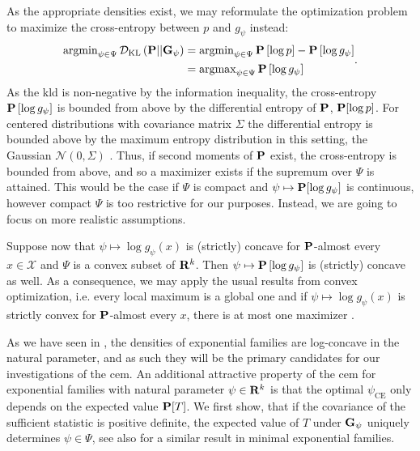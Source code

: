 As the appropriate densities exist, we may reformulate the optimization problem to maximize the cross-entropy between $p$ and $g_{\psi}$ instead:
\begin{align}
    \begin{split}
    \argmin_{\psi \in \Psi} \Dkl{\P}{\G_{\psi}} &=  \argmin_{\psi \in \Psi} \P \left[\log p \right] - \P \left[\log g_{\psi}\right] \\
    &= \argmax_{\psi \in \Psi} \P \left[\log g_{\psi}\right]
    \end{split} \label{eq:ce_argmax}.
\end{align}
As the \acrshort{kld} is non-negative by the information inequality, the cross-entropy $\P \left[ \log g_{\psi} \right]$ is bounded from above by the differential entropy of $\P$, $\P [\log p]$. For centered distributions with covariance matrix $\Sigma$ the differential entropy is bounded above by the maximum entropy distribution in this setting, the Gaussian $\mathcal N(0, \Sigma)$ \citep[Example 12.2.8]{Cover2006Elements}. Thus, if second moments of $\P$ exist, the cross-entropy is bounded from above, and so a maximizer exists if the supremum over $\Psi$ is attained. This would be the case if $\Psi$ is compact and $\psi \mapsto \P [\log g_{\psi}]$ is continuous, however compact $\Psi$ is too restrictive for our purposes. Instead, we are going to focus on more realistic assumptions.

Suppose now that $\psi \mapsto \log g_{\psi}(x)$ is (strictly) concave for $\P$-almost every $x \in \mathcal X$ and $\Psi$ is a convex subset of $\R^{k}$. Then $\psi \mapsto \P \left[\log g_{\psi}\right]$ is (strictly) concave as well. As a consequence, we may apply the usual results from convex optimization, i.e. every local maximum is a global one and if $\psi \mapsto \log g_{\psi}(x)$ is strictly convex for $\P$-almost every $x$, there is at most one maximizer \citep[Theorem 3.4.2]{Bazaraa2006Nonlinear}.

As we have seen in , the densities of exponential families are log-concave in the natural parameter, and as such they will be the primary candidates for our investigations of the \acrshort{cem}. 
An additional attractive property of the \gls{cem} for exponential families with natural parameter $\psi \in \R^{k}$ is that the optimal $\psi_{\text{CE}}$ only depends on the expected value $\P [T]$. We first show, that if the covariance of the sufficient statistic is positive definite, the expected value of $T$ under $\G_{\psi}$ uniquely determines $\psi \in \Psi$, see also \citep[Corollary 2.5]{Brown1986Fundamentals} for a similar result in minimal exponential families.

